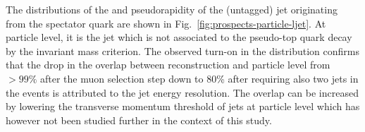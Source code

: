 
The distributions of the \pt and pseudorapidity of the (untagged) jet originating from the spectator quark are shown in Fig.~\ref{fig:prospects-particle-ljet}. 
At particle level, it is the jet which is not associated to the pseudo-top quark decay by the invariant mass criterion. 
The observed turn-on in the \pt distribution confirms that the drop in the overlap between reconstruction and particle level from $>99\%$ after the muon selection step down to 80\% after requiring also two jets in the events is attributed to the jet energy resolution. The overlap can be increased by lowering the transverse momentum threshold of jets at particle level which has however not been studied further in the context of this study.

